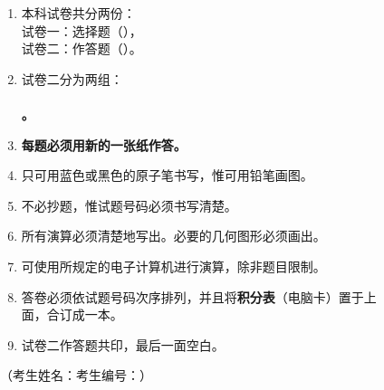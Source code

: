 \documentclass[12pt,a4paper]{exam-zh}
\newcommand{\ulinefill}[1]{\underline{\hspace{#1}}}
\begin{document}
\begin{enumerate}[label=（\arabic*）,leftmargin=2.8em,itemsep=0.38em]
  \item 本科试卷共分两份：\\
  \hspace*{1.3em}试卷一：选择题（\paperonepercentage），\\
  \hspace*{1.3em}试卷二：作答题（\papertwopercentage）。
    
  \item
  试卷二分为两组：\\
  \hspace*{1.3em}\textbf{\requiredgroupnotice}\\
  \hspace*{1.3em}\textbf{\electivegroupnotice。}

  \item \textbf{每题必须用新的一张纸作答。}

  \item 只可用蓝色或黑色的原子笔书写，惟可用铅笔画图。

  \item 不必抄题，惟试题号码必须书写清楚。

  \item 所有演算必须清楚地写出。必要的几何图形必须画出。

  \item 可使用所规定的电子计算机进行演算，除非题目限制。

  \item 答卷必须依试题号码次序排列，并且将\textbf{积分表}（电脑卡）置于上\\
  面，合订成一本。

  \item 试卷二作答题共印\questionpages，最后一面空白。
\end{enumerate}

\vspace{1.0em}

\begin{center}
  \fbox{\rule{0pt}{1.15em}\hspace{1.2em}{\bfseries 未经正式宣布\quad 不得翻看内页}\hspace{1.2em}}
\end{center}

\vspace{1.2em}

\noindent
（考生姓名：\ulinefill{4.4cm}\hfill 考生编号：\ulinefill{4.3cm}）


\newpage
\end{document}
